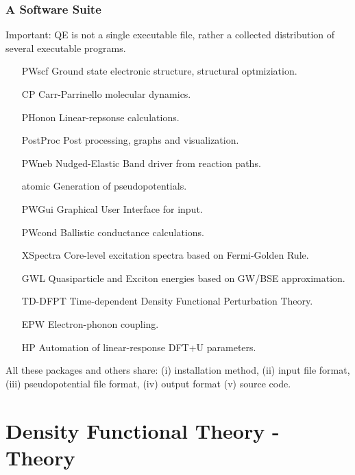 \documentclass{beamer}
\begin{document}
\begin{frame}
\footnotesize

\frametitle{A Software Suite}

Important: QE is not a single executable file, rather a collected distribution of several
executable programs.\\

\begin{center}
\begin{minipage}{0.85\textwidth}
\begin{tiny}
\begin{itemize}
   \item[\alert{PWscf}] Ground state electronic structure, structural optmiziation.
   \item[CP] Carr-Parrinello molecular dynamics.
   \item[PHonon] Linear-repsonse calculations.
   \item[\alert{PostProc}] Post processing, graphs and visualization.
   \item[PWneb] Nudged-Elastic Band driver from reaction paths.
   \item[atomic] Generation of pseudopotentials.
   \item[PWGui] Graphical User Interface for input.
   \item[PWcond] Ballistic conductance calculations.
   \item[\alert{XSpectra}] Core-level excitation spectra based on Fermi-Golden Rule.
   \item[GWL] Quasiparticle and Exciton energies based on GW/BSE approximation.
   \item[TD-DFPT] Time-dependent Density Functional Perturbation Theory.
   \item[EPW] Electron-phonon coupling.
   \item[HP] Automation of linear-response DFT+U parameters. 
\end{itemize}
\end{tiny}
\end{minipage}
\end{center}

All these packages and others share: (i) installation method, (ii) input file format,
(iii) pseudopotential file format, (iv) output format (v) source code.

\end{frame}

\section{Density Functional Theory - Theory}
\end{document}
